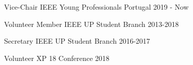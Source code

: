 

\begin{cvhonors}

  \cvhonor
    {Vice-Chair} %
    {IEEE Young Professionals Portugal} %
    {2019 - Now} %
    {} %

  \cvhonor
    {Volunteer Member} %
    {IEEE UP Student Branch} %
    {2013-2018} %
    {} %
    
  \cvhonor
    {Secretary} %
    {IEEE UP Student Branch} %
    {2016-2017} %
    {} %

  \cvhonor
    {Volunteer} %
    {XP 18 Conference} %
    {2018} %
    {} %

\end{cvhonors}